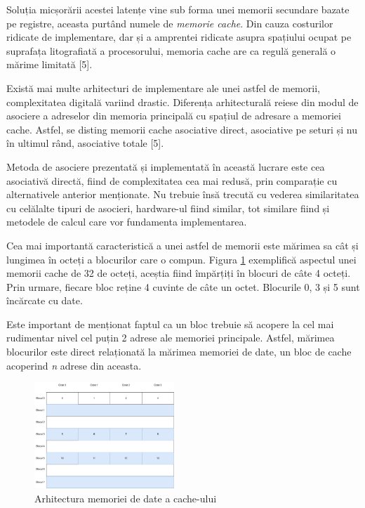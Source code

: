 \documentclass[12pt]{article}
\begin{document}
Soluția micșorării acestei latențe vine sub forma unei memorii secundare bazate pe registre, aceasta purtând numele de \textit{memorie cache}. Din cauza costurilor ridicate de implementare, dar și a amprentei ridicate asupra spațiului ocupat pe suprafața litografiată a procesorului, memoria cache are ca regulă generală o mărime limitată [5].

Există mai multe arhitecturi de implementare ale unei astfel de memorii, complexitatea digitală variind drastic. Diferența arhitecturală reiese din modul de asociere a adreselor din memoria principală cu spațiul de adresare a memoriei cache. Astfel, se disting memorii cache asociative direct, asociative pe seturi și nu în ultimul rând, asociative totale [5].

Metoda de asociere prezentată și implementată în această lucrare este cea asociativă directă, fiind de complexitatea cea mai redusă, prin comparație cu alternativele anterior menționate. Nu trebuie însă trecută cu vederea similaritatea cu celălalte tipuri de asocieri, hardware-ul fiind similar, tot similare fiind și metodele de calcul care vor fundamenta implementarea.

Cea mai importantă caracteristică a unei astfel de memorii este mărimea sa cât și lungimea în octeți a blocurilor care o compun. Figura \ref{Figura:41} exemplifică aspectul unei memorii cache de 32 de octeți, aceștia fiind împărțiți în blocuri de câte 4 octeți. Prin urmare, fiecare bloc reține 4 cuvinte de câte un octet. Blocurile 0, 3 și 5 sunt încărcate cu date.

 Este important de menționat faptul ca un bloc trebuie să acopere la cel mai rudimentar nivel cel puțin 2 adrese ale memoriei principale. Astfel, mărimea blocurilor este direct relaționată la mărimea memoriei de date, un bloc de cache acoperind \textit{n} adrese din aceasta.

 \begin{figure}[h!]
 \includegraphics[width=0.47\textwidth]{cache.pdf}
 \centering
 \caption{Arhitectura memoriei de date a cache-ului}
 \label{Figura:41}
 \end{figure}
 
\end{document}
